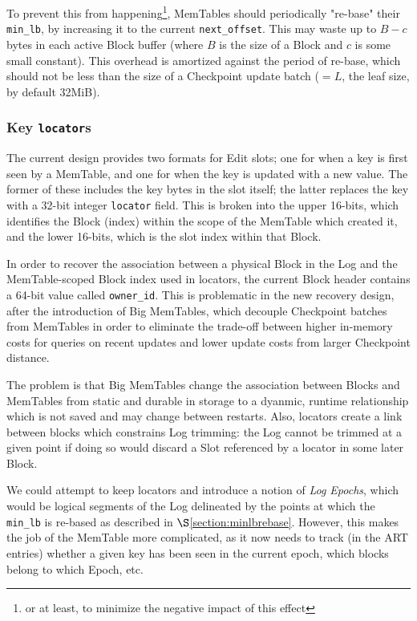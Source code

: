\documentclass[11pt]{article}
\begin{document}
To prevent this from happening\footnote{or at least, to minimize the
negative impact of this effect}, MemTables should periodically
"re-base" their \texttt{min\_lb}, by increasing it to the current
\texttt{next\_offset}.  This may waste up to $B-c$ bytes in each
active Block buffer (where $B$ is the size of a Block and $c$ is some
small constant).  This overhead is amortized against the period of
re-base, which should not be less than the size of a Checkpoint update
batch ($=L$, the leaf size, by default 32MiB).

\iffalse{}
\subsubsection{Key \texttt{locator}s}

The current design provides two formats for Edit slots; one for when a
key is first seen by a MemTable, and one for when the key is updated
with a new value.  The former of these includes the key bytes in the
slot itself; the latter replaces the key with a 32-bit integer
\texttt{locator} field.  This is broken into the upper 16-bits, which
identifies the Block (index) within the scope of the MemTable which
created it, and the lower 16-bits, which is the slot index within that
Block.

In order to recover the association between a physical Block in the
Log and the MemTable-scoped Block index used in locators, the current
Block header contains a 64-bit value called \texttt{owner\_id}.  This
is problematic in the new recovery design, after the introduction of
Big MemTables, which decouple Checkpoint batches from MemTables in
order to eliminate the trade-off between higher in-memory costs for
queries on recent updates and lower update costs from larger
Checkpoint distance.

The problem is that Big MemTables change the association between
Blocks and MemTables from static and durable in storage to a dyanmic,
runtime relationship which is not saved and may change between
restarts.  Also, locators create a link between blocks which
constrains Log trimming: the Log cannot be trimmed at a given point if
doing so would discard a Slot referenced by a locator in some later
Block.

We could attempt to keep locators and introduce a notion of
\textit{Log Epochs}, which would be logical segments of the Log
delineated by the points at which the \texttt{min\_lb} is re-based as
described in $\S$\ref{section:minlbrebase}.  However, this makes the
job of the MemTable more complicated, as it now needs to track (in the
ART entries) whether a given key has been seen in the current epoch,
which blocks belong to which Epoch, etc.
\end{document}
